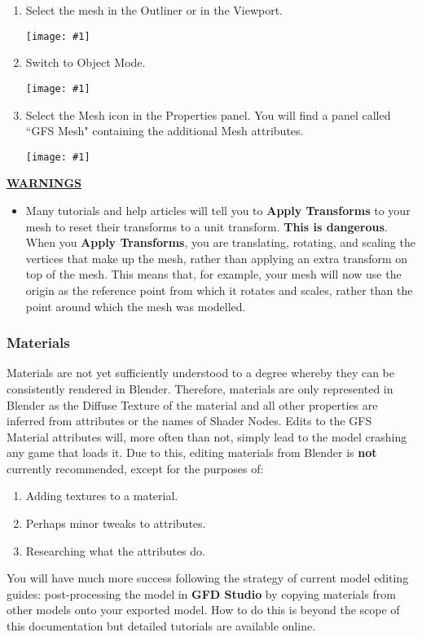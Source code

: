 \documentclass{article}
\newenvironment{guide}[1]
{
	\begin{center}
		\begin{tcolorbox}[%
			colback=black!20, 
			boxrule=0pt, 
			title=Step-by-step: #1,
			enhanced,
			breakable,
			overlay unbroken={%
                \draw[line width=1pt, black, rounded corners]
        	    (frame.north west) rectangle (frame.south east);
			},
    		overlay first={%
        		 \draw[line width=1pt, black, rounded corners]
        	    (frame.south west) -- (frame.north west) -- (frame.north east) -- (frame.south east);
                \draw[line width=1pt, black]
                (frame.south west) -- (frame.south east);
            },
    		overlay middle={%
                \draw[line width=1pt, black]
        	    (frame.north west) rectangle (frame.south east);
        	},
    		overlay last={%
                \draw[line width=1pt, black, rounded corners]
        	    (frame.north west) -- (frame.south west) -- (frame.south east) -- (frame.north east);
                \draw[line width=1pt, black]
                (frame.north west) -- (frame.north east);
           	}
        ]{}
    	\begin{enumerate}
}
{
    		\end{enumerate}
    	\end{tcolorbox}
	\end{center}  	 
}
\newcommand{\guideimage}[1]
{
	\begin{center}
		\texttt{[image: \#1]}
	\end{center}
}
\begin{document}
\begin{guide}{Accessing Extra Mesh Attributes}
\item Select the mesh in the Outliner or in the Viewport.
\guideimage{images/editing_models/edits_select_mesh.png}
\item Switch to Object Mode.
\guideimage{images/editing_models/edits_to_object_mode.png}
\item Select the Mesh icon in the Properties panel. You will find a panel called ``GFS Mesh" containing the additional Mesh attributes.
\guideimage{images/editing_models/edits_mesh_properties.png}
\end{guide}

\underline{\textbf{WARNINGS}}
\begin{itemize}
\item Many tutorials and help articles will tell you to \textbf{Apply Transforms} to your mesh to reset their transforms to a unit transform. \textbf{This is dangerous}. When you \textbf{Apply Transforms}, you are translating, rotating, and scaling the vertices that make up the mesh, rather than applying an extra transform on top of the mesh. This means that, for example, your mesh will now use the origin as the reference point from which it rotates and scales, rather than the point around which the mesh was modelled.
\end{itemize}

\subsubsection{Materials}
\label{SECTION::EditingMaterials}

Materials are not yet sufficiently understood to a degree whereby they can be consistently rendered in Blender. Therefore, materials are only represented in Blender as the Diffuse Texture of the material and all other properties are inferred from attributes or the names of Shader Nodes. Edits to the GFS Material attributes will, more often than not, simply lead to the model crashing any game that loads it. Due to this, editing materials from Blender is \textbf{not} currently recommended, except for the purposes of:
\begin{enumerate}
\item Adding textures to a material.
\item Perhaps minor tweaks to attributes.
\item Researching what the attributes do.
\end{enumerate}
You will have much more success following the strategy of current model editing guides: post-processing the model in \textbf{GFD Studio} by copying materials from other models onto your exported model. How to do this is beyond the scope of this documentation but detailed tutorials are available online.
\end{document}
